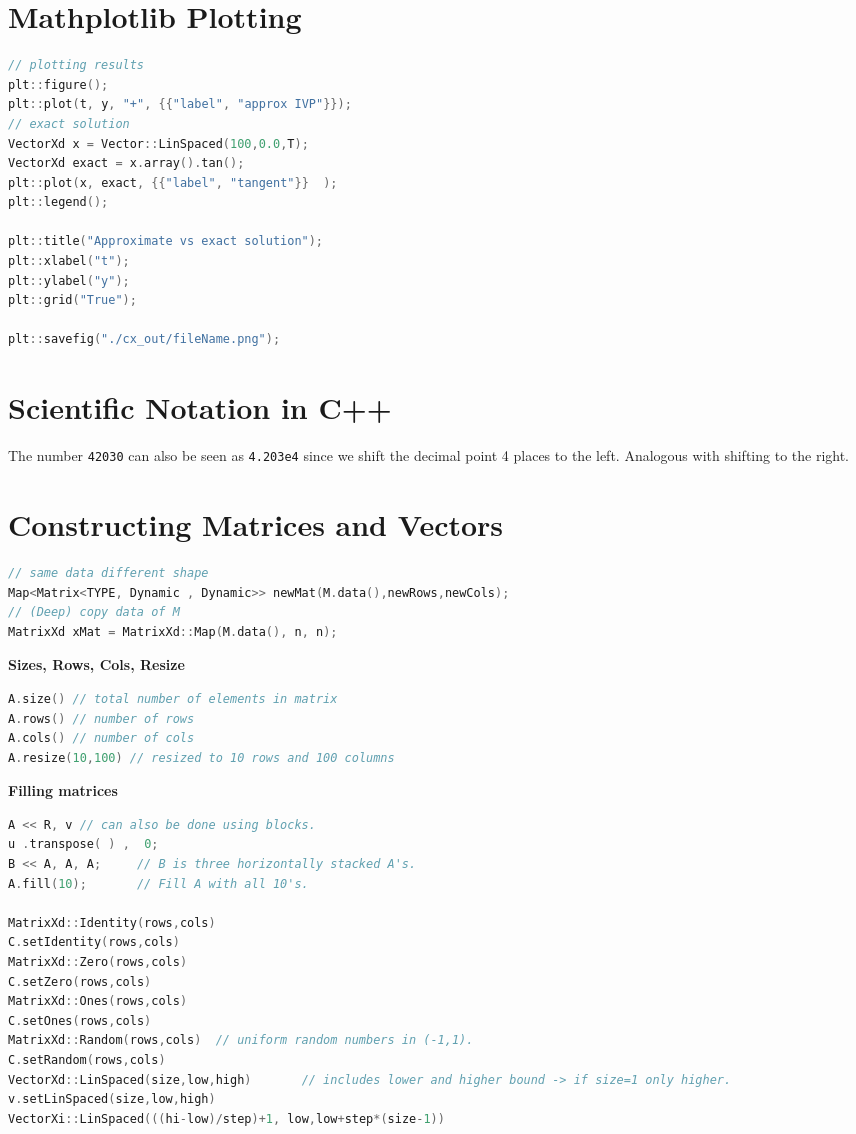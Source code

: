 \documentclass{sciposter}
\newcommand{\psection}[1]{\par \textbf{\large#1}}
\begin{document}
\begin{multicols}{2}
\section*{Mathplotlib Plotting}

\begin{lstlisting}[language=c++]
// plotting results
plt::figure();
plt::plot(t, y, "+", {{"label", "approx IVP"}});
// exact solution 
VectorXd x = Vector::LinSpaced(100,0.0,T);
VectorXd exact = x.array().tan();
plt::plot(x, exact, {{"label", "tangent"}}  );
plt::legend();

plt::title("Approximate vs exact solution");
plt::xlabel("t");
plt::ylabel("y");
plt::grid("True");

plt::savefig("./cx_out/fileName.png");
\end{lstlisting}


\section*{Scientific Notation in C++}

The number \texttt{42030} can also be seen as \texttt{4.203e4} since we shift the decimal point 4 places to the left. Analogous with shifting to the right.
	
\section*{Constructing Matrices and Vectors}
\begin{lstlisting}[language=C++]
// same data different shape
Map<Matrix<TYPE, Dynamic , Dynamic>> newMat(M.data(),newRows,newCols);
// (Deep) copy data of M
MatrixXd xMat = MatrixXd::Map(M.data(), n, n);
\end{lstlisting}


\psection{Sizes, Rows, Cols, Resize}
\begin{lstlisting}[language=C++]
A.size() // total number of elements in matrix
A.rows() // number of rows
A.cols() // number of cols
A.resize(10,100) // resized to 10 rows and 100 columns
\end{lstlisting}


\psection{Filling matrices}
\begin{lstlisting}[language=C++]
A << R,	v // can also be done using blocks. 
u .transpose( ) ,  0;
B << A, A, A;     // B is three horizontally stacked A's.
A.fill(10);       // Fill A with all 10's.

MatrixXd::Identity(rows,cols)          
C.setIdentity(rows,cols)                 
MatrixXd::Zero(rows,cols)                
C.setZero(rows,cols)                      
MatrixXd::Ones(rows,cols)          
C.setOnes(rows,cols)                 
MatrixXd::Random(rows,cols)  // uniform random numbers in (-1,1).
C.setRandom(rows,cols)                 
VectorXd::LinSpaced(size,low,high)       // includes lower and higher bound -> if size=1 only higher. 
v.setLinSpaced(size,low,high)         
VectorXi::LinSpaced(((hi-low)/step)+1, low,low+step*(size-1))
\end{lstlisting}




\end{multicols}
\end{document}

